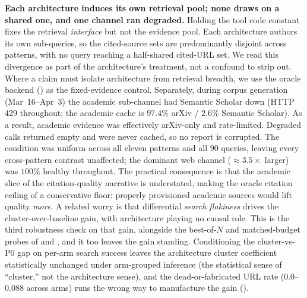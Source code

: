 \documentclass[11pt]{article}
\begin{document}
\textbf{Each architecture induces its own retrieval pool; none draws on a shared
one, and one channel ran degraded.} Holding the tool code constant fixes the retrieval
\emph{interface} but not the evidence pool. Each architecture authors its own sub-queries,
so the cited-source sets are predominantly disjoint across patterns, with no query reaching
a half-shared cited-URL set. We read this divergence as part of the architecture's
treatment, not a confound to strip out. Where a claim must isolate architecture from retrieval breadth, we use the oracle
backend () as the fixed-evidence control.
Separately, during corpus generation (Mar~16--Apr~3) the academic sub-channel had
Semantic Scholar down (HTTP 429 throughout; the academic cache is $97.4\%$ arXiv / $2.6\%$
Semantic Scholar). As a result, academic evidence was effectively arXiv-only and
rate-limited. Degraded calls returned empty and were never cached, so no report is corrupted. The
condition was uniform across all eleven patterns and all $90$ queries, leaving every
cross-pattern contrast unaffected; the dominant web channel ($\approx\!3.5\times$ larger) was
$100\%$ healthy throughout. The practical consequence is that the academic slice of the
citation-quality narrative is understated, making the oracle citation ceiling of
 a conservative floor: properly provisioned academic sources would lift
quality \emph{more}. A related worry is that
differential \emph{search
flakiness} drives the cluster-over-baseline gain, with architecture playing no causal
role. This is the third robustness check on that gain, alongside the best-of-$N$ and
matched-budget probes of  and , and it too leaves
the gain standing. Conditioning the cluster-vs-P0 gap on per-arm search success leaves the
architecture cluster coefficient statistically unchanged under arm-grouped inference (the
statistical sense of ``cluster,'' not the architecture sense), and the
dead-or-fabricated URL rate ($0.0$--$0.088$ across arms) runs the wrong way to manufacture the
gain ().
\end{document}
